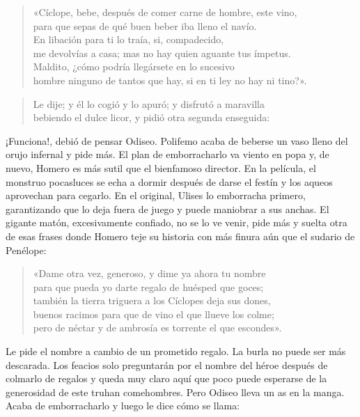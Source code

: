 \documentclass[11pt,a4paper]{article}
\begin{document}
\begin{verse}
«Cíclope, bebe, después de comer carne de hombre, este vino,\\
para que sepas de qué buen beber iba lleno el navío.\\
En libación para ti lo traía, si, compadecido,\\
me devolvías a casa; mas no hay quien aguante tus ímpetus.\\
Maldito, ¿cómo podría llegársete en lo sucesivo\\
hombre ninguno de tantos que hay, si en ti ley no hay ni tino?».
\end{verse}

\begin{verse}
Le dije; y él lo cogió y lo apuró; y disfrutó a maravilla\\
bebiendo el dulce licor, y pidió otra segunda enseguida:
\end{verse}

¡Funciona!, debió de pensar Odiseo. Polifemo acaba de beberse un vaso lleno del orujo infernal y pide más. El plan de emborracharlo va viento en popa y, de nuevo, Homero es más sutil que el bienfamoso director. En la película, el monstruo pocasluces se echa a dormir después de darse el festín y los aqueos aprovechan para cegarlo. En el original, Ulises lo emborracha primero, garantizando que lo deja fuera de juego y puede maniobrar a sus anchas. El gigante matón, excesivamente confiado, no se lo ve venir, pide más y suelta otra de esas frases donde Homero teje su historia con más finura aún que el sudario de Penélope:

\begin{verse}
«Dame otra vez, generoso, y dime ya ahora tu nombre\\
para que pueda yo darte regalo de huésped que goces;\\
también la tierra triguera a los Cíclopes deja sus dones,\\
buenos racimos para que de vino el que llueve los colme;\\
pero de néctar y de ambrosía es torrente el que escondes».
\end{verse}

Le pide el nombre a cambio de un prometido regalo. La burla no puede ser más descarada. Los feacios solo preguntarán por el nombre del héroe después de colmarlo de regalos y queda muy claro aquí que poco puede esperarse de la generosidad de este truhan comehombres. Pero Odiseo lleva un as en la manga. Acaba de emborracharlo y luego le dice cómo se llama:
\end{document}
